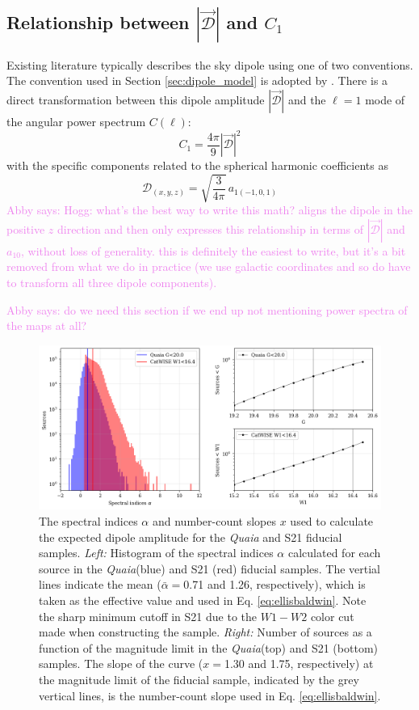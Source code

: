 \documentclass[modern]{aastex631}
\newcommand{\abby}[1]{\textcolor{violet}{Abby says: #1}}
\newcommand{\quaia}{\textsl{Quaia}\xspace}
\begin{document}
\subsection{Relationship between $|\vec{\mathcal{D}}|$ and $C_1$}

Existing literature typically describes the sky dipole using one of two conventions.
The convention used in Section \ref{sec:dipole_model} is adopted by \citet{secrest_test_2021}.
There is a direct transformation between this dipole amplitude $|\vec{\mathcal{D}}|$ and the $\ell=1$ mode of the angular power spectrum $C(\ell)$:
\begin{equation}
    C_1 = \frac{4\pi}{9}|\vec{\mathcal{D}}|^2
\end{equation}
with the specific components related to the spherical harmonic coefficients as
\begin{equation}
    \mathcal{D}_{(x,y,z)} = \sqrt{\frac{3}{4\pi}}\,a_{1(-1,0,1)}
\end{equation}
\abby{Hogg: what's the best way to write this math? \citet{gibelyou_dipoles_2012} aligns the dipole in the positive $z$ direction and then only expresses this relationship in terms of $|\vec{\mathcal{D}}|$ and $a_{10}$, without loss of generality. this is definitely the easiest to write, but it's a bit removed from what we do in practice (we use galactic coordinates and so do have to transform all three dipole components).}

\abby{do we need this section if we end up not mentioning power spectra of the maps at all?}

\begin{figure}
    \centering
    \includegraphics[width=\textwidth]{images/alphas_xs_G20.5.png}
    \caption{The spectral indices $\alpha$ and number-count slopes $x$ used to calculate the expected dipole amplitude for the \quaia and S21 fiducial samples. \textit{Left:} Histogram of the spectral indices $\alpha$ calculated for each source in the \quaia (blue) and S21 (red) fiducial samples. The vertial lines indicate the mean ($\bar\alpha=$0.71 and 1.26, respectively), which is taken as the effective value and used in Eq. \ref{eq:ellisbaldwin}. Note the sharp minimum cutoff in S21 due to the $W1-W2$ color cut made when constructing the sample. \textit{Right:} Number of sources as a function of the magnitude limit in the \quaia (top) and S21 (bottom) samples. The slope of the curve ($x=$1.30 and 1.75, respectively) at the magnitude limit of the fiducial sample, indicated by the grey vertical lines, is the number-count slope used in Eq. \ref{eq:ellisbaldwin}.}
    \label{fig:alphas_xs}
\end{figure}
\end{document}
